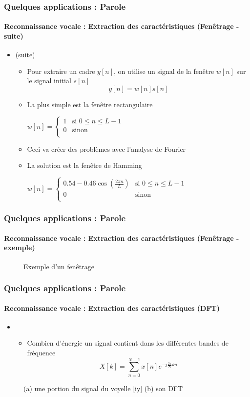 \documentclass[xcolor=table]{beamer}
\begin{document}
\begin{frame}
	\frametitle{Quelques applications : Parole}
	\framesubtitle{Reconnaissance vocale : Extraction des caractéristiques (Fenêtrage - suite)}
	\begin{itemize}
		\item {} (suite)
		\begin{itemize}
			\item Pour extraire un cadre $y[n]$, on utilise un signal de la fenêtre $w[n]$ sur le signal initial $s[n]$
			\[y[n] = w[n] s[n]\]
			\item La plus simple est la fenêtre rectangulaire 
			
			$w[n] = \begin{cases}
			1 & \text{si } 0 \le n \le L-1 \\
			0 & \text{sinon }\\
			\end{cases}$
			\item Ceci va créer des problèmes avec l'analyse de Fourier 
			\item La solution est la fenêtre de Hamming
			
			$w[n] = \begin{cases}
			0.54 - 0.46 \cos (\frac{2\pi n}{L}) & \text{si } 0 \le n \le L-1 \\
			0 & \text{sinon }\\
			\end{cases}$
		\end{itemize}
	\end{itemize}
\end{frame}

\begin{frame}
	\frametitle{Quelques applications : Parole}
	\framesubtitle{Reconnaissance vocale : Extraction des caractéristiques (Fenêtrage - exemple)}
	
	\begin{figure}
		\centering
		\caption{Exemple d'un fenêtrage \cite{2020-jurafsky-martin}}
	\end{figure}
	
\end{frame}

\begin{frame}
	\frametitle{Quelques applications : Parole}
	\framesubtitle{Reconnaissance vocale : Extraction des caractéristiques (DFT)}
	\begin{itemize}
		\item {}
		\begin{itemize}
			\item Combien d'énergie un signal contient dans les différentes bandes de fréquence
			\[X[k] = \sum\limits_{n=0}^{N-1} x[n] e^{-j\frac{2\pi}{N} k n}\]
		\end{itemize}
	\end{itemize}
	\begin{figure}
		\centering
		\caption{(a) une portion du signal du voyelle [iy] (b) son DFT \cite{2020-jurafsky-martin}}
	\end{figure}
\end{frame}
\end{document}
